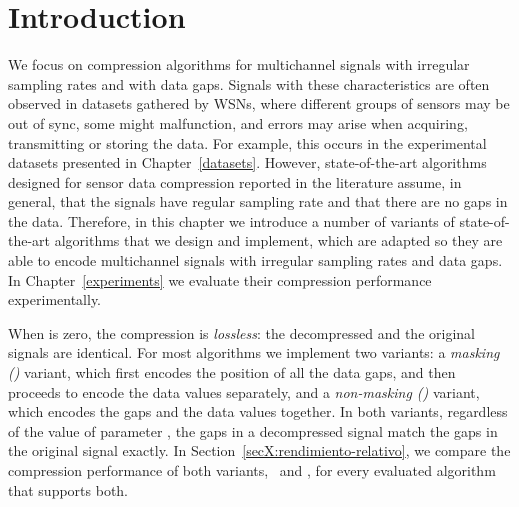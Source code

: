 

\section{Introduction}
\label{algo:overview}

We focus on compression algorithms for multichannel signals with irregular sampling rates and with data gaps. Signals with these characteristics are often observed in datasets gathered by WSNs, where different groups of sensors may be out of sync, some might malfunction, and errors may arise when acquiring, transmitting or storing the data. For example, this occurs in the experimental datasets presented in Chapter~\ref{datasets}. However, state-of-the-art algorithms designed for sensor data compression reported in the literature \cite{AnEva2013, Signal2016} assume, in general, that the signals have regular sampling rate and that there are no gaps in the data. Therefore, in this chapter we introduce a number of variants of state-of-the-art algorithms that we design and implement, which are adapted so they are able to encode multichannel signals with irregular sampling rates and data gaps. In Chapter~\ref{experiments} we evaluate their compression performance experimentally.



\begin{defcion}
\end{defcion}

\vspace{-5pt}
When \maxerror is zero, the compression is \textit{lossless}: the decompressed and the original signals are identical. For most algorithms we implement two variants: a \textit{masking (\maskalgo)} variant, which first encodes the position of all the data gaps, and then proceeds to encode the data values separately, and a \textit{non-masking (\NOmaskalgo)} variant, which encodes the gaps and the data values together. In both variants, regardless of the value of parameter \maxerror, the gaps in a decompressed signal match the gaps in the original signal exactly. In Section~\ref{secX:rendimiento-relativo}, we compare the compression performance of both variants, \maskalgo\ and \NOmaskalgo, for every evaluated algorithm that supports both.


